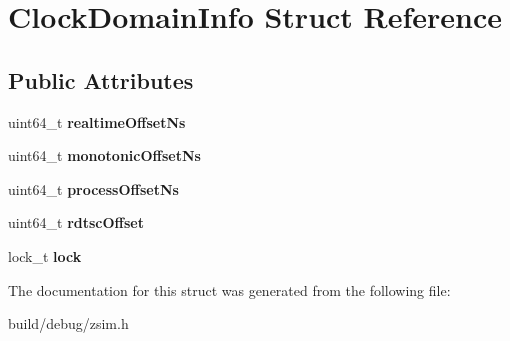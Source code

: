 \hypertarget{structClockDomainInfo}{\section{Clock\-Domain\-Info Struct Reference}
\label{structClockDomainInfo}
}
\subsection*{Public Attributes}
\begin{DoxyCompactItemize}
\item 
\hypertarget{structClockDomainInfo_a4a9add2ee0200c3bb352410d0e90bdb3}{uint64\-\_\-t {\bfseries realtime\-Offset\-Ns}}\label{structClockDomainInfo_a4a9add2ee0200c3bb352410d0e90bdb3}

\item 
\hypertarget{structClockDomainInfo_a89006057ee20c89413bfeb776adb48d6}{uint64\-\_\-t {\bfseries monotonic\-Offset\-Ns}}\label{structClockDomainInfo_a89006057ee20c89413bfeb776adb48d6}

\item 
\hypertarget{structClockDomainInfo_a79055a990e2a53a00f3b794979593e3b}{uint64\-\_\-t {\bfseries process\-Offset\-Ns}}\label{structClockDomainInfo_a79055a990e2a53a00f3b794979593e3b}

\item 
\hypertarget{structClockDomainInfo_a3dd21b35e43a89a7babcd9f038490454}{uint64\-\_\-t {\bfseries rdtsc\-Offset}}\label{structClockDomainInfo_a3dd21b35e43a89a7babcd9f038490454}

\item 
\hypertarget{structClockDomainInfo_a413f404072ec599ea0d052599cff8bd5}{lock\-\_\-t {\bfseries lock}}\label{structClockDomainInfo_a413f404072ec599ea0d052599cff8bd5}

\end{DoxyCompactItemize}


The documentation for this struct was generated from the following file\-:\begin{DoxyCompactItemize}
\item 
build/debug/zsim.\-h\end{DoxyCompactItemize}
